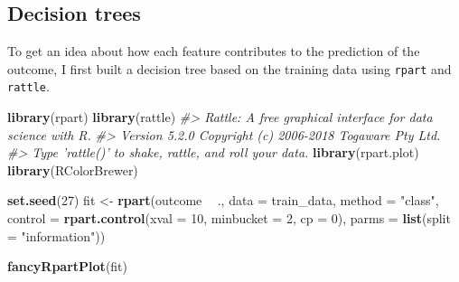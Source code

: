 \documentclass[]{book}
\newenvironment{Shaded}{\begin{snugshade}}{\end{snugshade}}
\newcommand{\CommentTok}[1]{\textcolor[rgb]{0.56,0.35,0.01}{\textit{#1}}}
\newcommand{\DataTypeTok}[1]{\textcolor[rgb]{0.13,0.29,0.53}{#1}}
\newcommand{\DecValTok}[1]{\textcolor[rgb]{0.00,0.00,0.81}{#1}}
\newcommand{\FloatTok}[1]{\textcolor[rgb]{0.00,0.00,0.81}{#1}}
\newcommand{\KeywordTok}[1]{\textcolor[rgb]{0.13,0.29,0.53}{\textbf{#1}}}
\newcommand{\NormalTok}[1]{#1}
\newcommand{\OperatorTok}[1]{\textcolor[rgb]{0.81,0.36,0.00}{\textbf{#1}}}
\newcommand{\OtherTok}[1]{\textcolor[rgb]{0.56,0.35,0.01}{#1}}
\newcommand{\StringTok}[1]{\textcolor[rgb]{0.31,0.60,0.02}{#1}}
\begin{document}
\begin{Shaded}
\end{Shaded}

\hypertarget{decision-trees}{%
\subsection{Decision trees}\label{decision-trees}}

To get an idea about how each feature contributes to the prediction of the outcome, I first built a decision tree based on the training data using \texttt{rpart} and \texttt{rattle}.

\begin{Shaded}
\begin{Highlighting}[]
\KeywordTok{library}\NormalTok{(rpart)}
\KeywordTok{library}\NormalTok{(rattle)}
\CommentTok{#> Rattle: A free graphical interface for data science with R.}
\CommentTok{#> Version 5.2.0 Copyright (c) 2006-2018 Togaware Pty Ltd.}
\CommentTok{#> Type 'rattle()' to shake, rattle, and roll your data.}
\KeywordTok{library}\NormalTok{(rpart.plot)}
\KeywordTok{library}\NormalTok{(RColorBrewer)}

\KeywordTok{set.seed}\NormalTok{(}\DecValTok{27}\NormalTok{)}
\NormalTok{fit <-}\StringTok{ }\KeywordTok{rpart}\NormalTok{(outcome }\OperatorTok{~}\StringTok{ }\NormalTok{., }\DataTypeTok{data =}\NormalTok{ train_data, }\DataTypeTok{method =} \StringTok{"class"}\NormalTok{, }
             \DataTypeTok{control =} \KeywordTok{rpart.control}\NormalTok{(}\DataTypeTok{xval =} \DecValTok{10}\NormalTok{, }\DataTypeTok{minbucket =} \DecValTok{2}\NormalTok{, }\DataTypeTok{cp =} \DecValTok{0}\NormalTok{), }
             \DataTypeTok{parms =} \KeywordTok{list}\NormalTok{(}\DataTypeTok{split =} \StringTok{"information"}\NormalTok{))}

\KeywordTok{fancyRpartPlot}\NormalTok{(fit)}
\end{Highlighting}
\end{Shaded}
\end{document}

